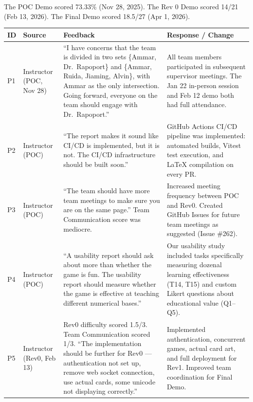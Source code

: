 \documentclass{article}
\begin{document}
The POC Demo scored 73.33\% (Nov 28, 2025). The Rev 0 Demo scored 14/21 (Feb 13, 2026). The Final Demo scored 18.5/27 (Apr 1, 2026).

\begin{longtable}{p{} p{} p{} p{}}
\toprule
\textbf{ID} & \textbf{Source} & \textbf{Feedback} & \textbf{Response / Change} \\
\midrule
\endhead
\bottomrule
\endfoot

P1 & Instructor (POC, Nov 28) & ``I have concerns that the team is divided in two sets \{Ammar, Dr.\ Rapoport\} and \{Ammar, Ruida, Jiaming, Alvin\}, with Ammar as the only intersection. Going forward, everyone on the team should engage with Dr.\ Rapoport.'' & All team members participated in subsequent supervisor meetings. The Jan 22 in-person session and Feb 12 demo both had full attendance. \\
\midrule

P2 & Instructor (POC) & ``The report makes it sound like CI/CD is implemented, but it is not. The CI/CD infrastructure should be built soon.'' & GitHub Actions CI/CD pipeline was implemented: automated builds, Vitest test execution, and LaTeX compilation on every PR. \\
\midrule

P3 & Instructor (POC) & ``The team should have more team meetings to make sure you are on the same page.'' Team Communication score was mediocre. & Increased meeting frequency between POC and Rev0. Created GitHub Issues for future team meetings as suggested (Issue \#262). \\
\midrule

P4 & Instructor (POC) & ``A usability report should ask about more than whether the game is fun. The usability report should measure whether the game is effective at teaching different numerical bases.'' & Our usability study included tasks specifically measuring dozenal learning effectiveness (T14, T15) and custom Likert questions about educational value (Q1--Q5). \\
\midrule

P5 & Instructor (Rev0, Feb 13) & Rev0 difficulty scored 1.5/3. Team Communication scored 1/3. ``The implementation should be further for Rev0 --- authentication not set up, remove web socket connection, use actual cards, some unicode not displaying correctly.'' & Implemented authentication, concurrent games, actual card art, and full deployment for Rev1. Improved team coordination for Final Demo. \\
\midrule


\end{longtable}
\end{document}
